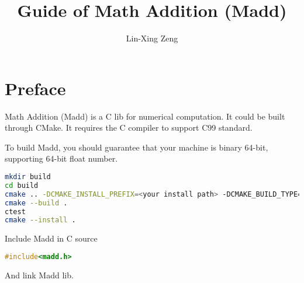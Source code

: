 \documentclass[a4paper, oneside,]{book}
\title{Guide of Math Addition (Madd)}
\author{Lin-Xing Zeng}
\begin{document}
\maketitle
\tableofcontents

\chapter*{Preface}

\indent Math Addition (Madd) is a C lib for numerical computation. It could be built through CMake. It requires the C compiler to support C99 standard.

To build Madd, you should guarantee that your machine is binary 64-bit, supporting 64-bit float number.

\begin{lstlisting}[language=bash, title={Build Madd in source dir.},]
mkdir build
cd build
cmake .. -DCMAKE_INSTALL_PREFIX=<your install path> -DCMAKE_BUILD_TYPE=Release
cmake --build .
ctest
cmake --install .
\end{lstlisting}

Include Madd in C source

\begin{lstlisting}[language=C, title={include Madd header.},]
#include<madd.h>
\end{lstlisting}

And link Madd lib.



\end{document}
